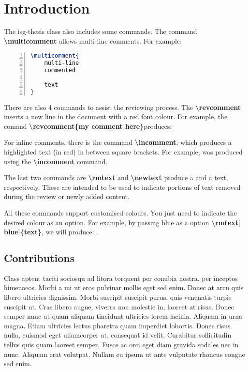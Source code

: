 \chapter{Introduction}\label{Introduction_chapter}

The isg-thesis class also includes some commands. The command \textbf{\textbackslash{multicomment}} allows multi-line comments. For example:

\begin{lstlisting}[frame=single,
					frameround=tttt,
					rulecolor=\color{black},
					language=TeX,
					basicstyle=\small,
					backgroundcolor=\color{black!10},
					numbers=left,
					numberstyle=\small\color{gray},
					xleftmargin=50pt,
					xrightmargin=50pt,
					framextopmargin=2pt,
					framexrightmargin=3pt,
					framexleftmargin=3pt,
					framexbottommargin=2pt,
				]
\multicomment{
    multi-line
    commented
    
    text
}
\end{lstlisting}

There are also 4 commands to assist the reviewing process. The \textbf{\textbackslash{revcomment}} inserts a new line in the document with a red font colour. For example, the comand \textbf{\textbackslash{revcomment}\{my comment here\}}produces:



For inline comments, there is the command \textbf{\textbackslash{incomment}}, which produces a highlighted text (in red) in between square brackets. For example,  was produced using the \textbf{\textbackslash{incomment}} command.

The last two commands are \textbf{\textbackslash{rmtext}} and \textbf{\textbackslash{newtext}} produce a  and a  text, respectively. These are intended to be used to indicate portions of text removed during the review or newly added content.

All these commands support customised colours. You just need to indicate the desired colour as an option. For example, by passing blue as a option \textbf{\textbackslash{rmtext}$[$blue$]$\{text\}}, we will produce: .

\section{Contributions}

Class aptent taciti sociosqu ad litora torquent per conubia nostra, per inceptos himenaeos. Morbi a mi ut eros pulvinar mollis eget sed enim. Donec at arcu quis libero ultricies dignissim. Morbi suscipit suscipit purus, quis venenatis turpis suscipit ut. Cras libero augue, viverra non molestie in, laoreet at risus. Donec semper nunc ut quam aliquam tincidunt ultricies lorem lacinia. Aliquam in urna magna. Etiam ultricies lectus pharetra quam imperdiet lobortis. Donec risus nulla, euismod eget ullamcorper at, consequat id velit. Curabitur sollicitudin tellus quis quam laoreet semper. Fusce ac orci eget diam gravida sodales nec in nunc. Aliquam erat volutpat. Nullam eu ipsum ut ante vulputate rhoncus congue sed enim.

